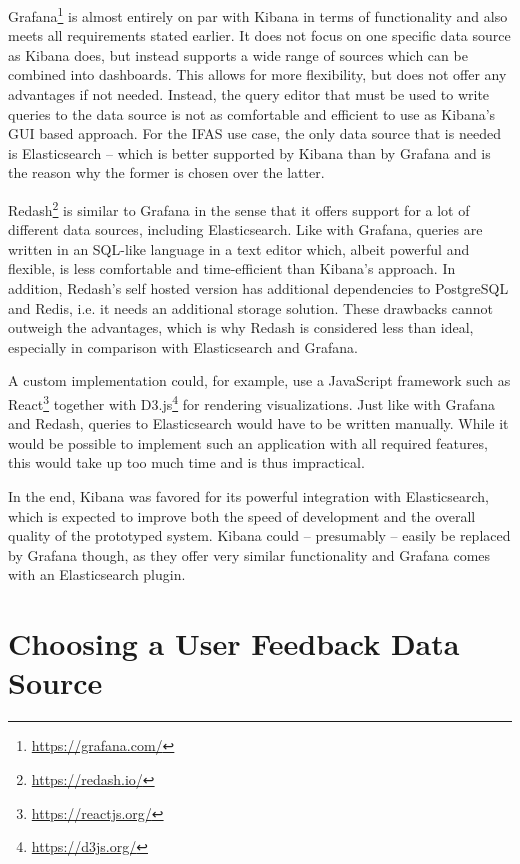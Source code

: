 Grafana\footnote{\url{https://grafana.com/}} is almost entirely on par with Kibana in terms of functionality and also meets all requirements stated earlier.
It does not focus on one specific data source as Kibana does, but instead supports a wide range of sources which can be combined into dashboards.
This allows for more flexibility, but does not offer any advantages if not needed.
Instead, the query editor that must be used to write queries to the data source is not as comfortable and efficient to use as Kibana's GUI based approach.
For the \ac{IFAS} use case, the only data source that is needed is Elasticsearch -- which is better supported by Kibana than by Grafana and is the reason why the former is chosen over the latter.

Redash\footnote{\url{https://redash.io/}} is similar to Grafana in the sense that it offers support for a lot of different data sources, including Elasticsearch.
Like with Grafana, queries are written in an \ac{SQL}-like language in a text editor which, albeit powerful and flexible, is less comfortable and time-efficient than Kibana's approach.
In addition, Redash's self hosted version has additional dependencies to PostgreSQL and Redis, i.e. it needs an additional storage solution.
These drawbacks cannot outweigh the advantages, which is why Redash is considered less than ideal, especially in comparison with Elasticsearch and Grafana.

A custom implementation could, for example, use a JavaScript framework such as React\footnote{\url{https://reactjs.org/}} together with D3.js\footnote{\url{https://d3js.org/}} for rendering visualizations.
Just like with Grafana and Redash, queries to Elasticsearch would have to be written manually.
While it would be possible to implement such an application with all required features, this would take up too much time and is thus impractical.

In the end, Kibana was favored for its powerful integration with Elasticsearch, which is expected to improve both the speed of development and the overall quality of the prototyped system.
Kibana could -- presumably -- easily be replaced by Grafana though, as they offer very similar functionality and Grafana comes with an Elasticsearch plugin.

\section{Choosing a User Feedback Data Source}
\label{sec:design:data-source}


